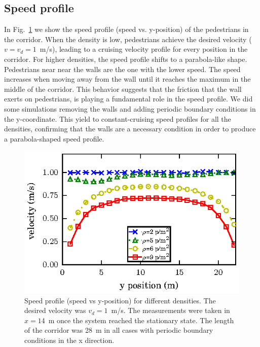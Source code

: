 \subsection{Speed profile}

In Fig.~\ref{speed-profile-w22} we show the speed profile (speed vs. y-position) of the pedestrians in the  corridor. When the density is low, pedestrians achieve the desired velocity ($v=v_d=1$~m/s), leading to a cruising velocity profile for every position in the corridor. For higher densities, the speed profile shifts to a parabola-like shape. Pedestrians near near the walls are the one with the lower speed. The speed increases when moving away from the wall until it reaches the maximum in the middle of the corridor. This behavior suggests that the friction that the wall exerts on pedestrians, is playing a fundamental role in the speed profile. We did some simulations removing the walls and adding periodic boundary conditions in the y-coordinate. This yield to constant-cruising speed profiles for all the densities, confirming that the walls are a necessary condition in order to produce a parabola-shaped speed profile.\\



\begin{figure}[htbp!]
\includegraphics[width=\columnwidth]
{plots/v(y)_width22_k24.eps}
\caption{\label{speed-profile-w22} Speed profile (speed vs y-position) for different densities. The desired velocity was $v_d = 1$~m/s. The measurements were taken in $x=14$~m once the system reached the stationary state. The length of the corridor was 28~m in all cases with periodic boundary conditions in the x direction.  }
\end{figure}

